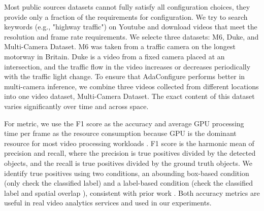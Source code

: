 Most public sources datasets cannot fully satisfy all configuration choices, they provide only a fraction of the requirements for configuration. %
We try to search keywords (e.g., "highway traffic") on Youtube and download videos that meet the resolution and frame rate requirements. We selecte three datasets: M6, Duke, and Multi-Camera Dataset. M6 was taken from a traffic camera on the longest motorway in Britain. Duke is a video from a fixed camera placed at an intersection, and the traffic flow in the video increases or decreases periodically with the traffic light change. 
To ensure that AdaConfigure performs better in multi-camera inference, we combine three videos collected from different locations into one video dataset, Multi-Camera Dataset. The exact content of this dataset varies significantly over time and across space.

For metric, we use the F1 score as the accuracy and average GPU processing time per frame as the resource consumption because GPU is the dominant resource for most video processing workloads \cite{jiang2018chameleon}. F1 score is the harmonic mean of precision and recall, where the precision is true positives divided by the detected objects, and the recall is true positives divided by the ground truth objects. We identify true positives using two conditions, an abounding box-based condition (only check the classified label) and a label-based condition (check the classified label and spatial overlap \cite{overlap}), consistent with prior work \cite{jiang2018chameleon,noscope}. Both accuracy metrics are useful in real video analytics services and used in our experiments.


